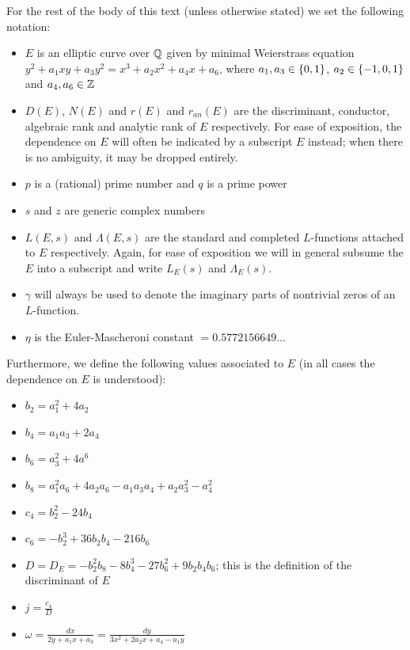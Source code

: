 \documentclass[10pt]{article}
\newcommand{\Les}{L_E(s)}
\newcommand{\Lams}{\Lambda_E(s)}
\begin{document}
For the rest of the body of this text (unless otherwise stated) we set the following notation:
\begin{itemize}
\item $E$ is an elliptic curve over $\mathbb{Q}$ given by minimal Weierstrass equation $y^2 + a_1 xy + a_3 y^2 = x^3 + a_2 x^2 + a_4 x + a_6$, where $a_1, a_3 \in \left\{0,1\right\}$, $a_2 \in \left\{-1,0,1\right\}$ and $a_4,a_6 \in \mathbb{Z}$
\item $D(E)$, $N(E)$ and $r(E)$  and $r_{an}(E)$ are the discriminant, conductor, algebraic rank and analytic rank of $E$ respectively. For ease of exposition, the dependence on $E$ will often be indicated by a subscript $E$ instead; when there is no ambiguity, it may be dropped entirely.
\item $p$ is a (rational) prime number and $q$ is a prime power
\item $s$ and $z$ are generic complex numbers
\item $L(E,s)$ and $\Lambda(E,s)$ are the standard and completed $L$-functions attached to $E$ respectively. Again, for ease of exposition we will in general subsume the $E$ into a subscript and write $\Les$ and $\Lams$.
\item $\gamma$ will always be used to denote the imaginary parts of nontrivial zeros of an $L$-function.
\item $\eta$ is the Euler-Mascheroni constant $= 0.5772156649\ldots$ \\
\end{itemize}

Furthermore, we define the following values associated to $E$ (in all cases the dependence on $E$ is understood):
\begin{itemize}
\item $b_2 = a_1^2 + 4a_2$
\item $b_4 = a_1 a_3 + 2a_4$
\item $b_6 = a_3^2 + 4a^6$
\item $b_8 = a_1^2 a_6 + 4 a_2 a_6 - a_1 a_3 a_4 + a_2 a_3^2 - a_4^2$
\item $c_4 = b_2^2 - 24 b_4$
\item $c_6 = -b_2^3 + 36 b_2 b_4  - 216 b_6$
\item $D = D_E = -b_2^2 b_8 - 8 b_4^3 - 27 b_6^2 + 9 b_2 b_4 b_6$; this is the definition of the discriminant of $E$
\item $j = \frac{c_4}{D}$
\item $\omega = \frac{dx}{2y + a_1 x + a_3} = \frac{dy}{3x^2 + 2a_2 x + a_4 - a_1 y}$
\end{itemize}
\end{document}
